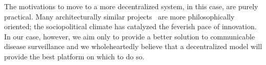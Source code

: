 \documentclass{article}
\begin{document}
\par The motivations to move to a more decentralized system, in this case, are purely practical. Many architecturally similar projects~\cite{Nakamoto:2008ti,Xu:2010vs,Buterin:2014wo} are more philosophically oriented; the sociopolitical climate has catalyzed the feverish pace of innovation. In our case, however, we aim only to provide a better solution to communicable disease surveillance and we wholeheartedly believe that a decentralized model will provide the best platform on which to do so.




\printbibliography
\end{document}
